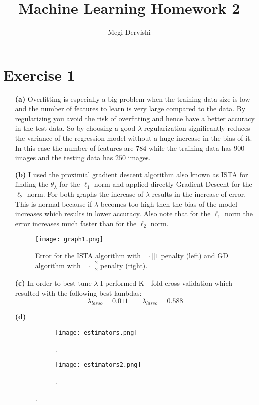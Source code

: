 \documentclass[10pt,a4paper]{article}
\author{Megi Dervishi}
\title{Machine Learning Homework 2}
\begin{document}
\maketitle
\section*{Exercise 1}
\begin{enumerate}
\item[\textbf{(a)}]  Overfitting is especially a big problem when the training data size is low and the number of features to learn is very large compared to the data. By regularizing you avoid the risk of overfitting and hence have a better accuracy in the test data. So by choosing a good $\lambda$ regularization significantly reduces the variance of the regression model without a huge increase in the bias of it. In this case the number of features are $784$ while the training data has 900 images and the testing data has $250$ images.
\item[\textbf{(b)}] I used the proximial gradient descent algorithm also known as ISTA for finding the $\theta_{\lambda}$ for the $\ell_1$ norm and applied directly Gradient Descent for the $\ell_2$ norm. For both graphs the increase of $\lambda$ results in the increase of error. This is normal because if $\lambda$ becomes too high then the bias of the model increases which results in lower accuracy. Also note that for the $\ell_1$ norm the error increases much faster than for the $\ell_2$ norm.

\begin{figure}[h!]
\centering
\texttt{[image: graph1.png]}
\caption{Error for the ISTA algorithm with $||\cdot||1$ penalty (left) and GD algorithm with $||\cdot||_2^2$ penalty (right).}
\end{figure}
 
\item[\textbf{(c)}] In order to  best tune $\lambda$ I performed K - fold cross validation which resulted with the following best lambdas:
$$ \lambda_{lasso} = 0.011 \quad \quad \lambda_{lasso} = 0.588$$

\item[\textbf{(d)}]
\begin{figure}[h!]
\centering
\begin{subfigure}[b]{0.5\textwidth}
\texttt{[image: estimators.png]}
\caption{.}
\end{subfigure}
\begin{subfigure}[b]{0.5\textwidth}
\texttt{[image: estimators2.png]}
\caption{.}
\end{subfigure}
\end{figure}

\end{enumerate}
\end{document}
